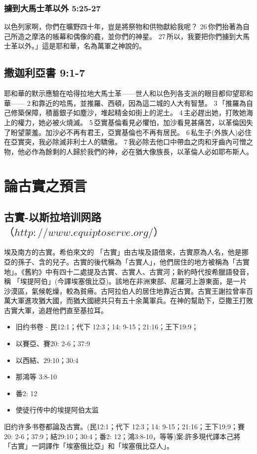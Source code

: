 \subsubsection{擄到大馬士革以外 5:25-27}
以色列家啊，你們在曠野四十年，豈是將祭物和供物獻給我呢？ 26 你們抬著為自己所造之摩洛的帳幕和偶像的龕，並你們的神星。 27 所以，我要把你們擄到大馬士革以外。」這是耶和華，名為萬軍之神說的。




\subsection{撒迦利亞書 9:1-7}
耶和華的默示應驗在哈得拉地大馬士革——世人和以色列各支派的眼目都仰望耶和華—— 2 和靠近的哈馬，並推羅、西頓，因為這二城的人大有智慧。 3 「推羅為自己修築保障，積蓄銀子如塵沙，堆起精金如街上的泥土。 4 主必趕出她，打敗她海上的權力，她必被火燒滅。 5 亞實基倫看見必懼怕，加沙看見甚痛苦，以革倫因失了盼望蒙羞。加沙必不再有君王，亞實基倫也不再有居民。 6 私生子(外族人)必住在亞實突，我必除滅非利士人的驕傲。 7 我必除去他口中帶血之肉和牙齒內可憎之物，他必作為餘剩的人歸於我們的神，必在猶大像族長，以革倫人必如耶布斯人。







\section{論古實之預言}
\subsection{古實-以斯拉培训网路$（http://www.equiptoserve.org/）$}
埃及南方的古實。希伯來文的 「古實」由古埃及語借來，古實原為人名，他是挪亞的孫子、含的兒子。古實的後代稱為「古實人」，他們居住的地方被稱為「古實地」。《舊約》中有四十二處提及古實、古實人、古實河；新約時代按希臘語發音，稱 「埃提阿伯」(今譯埃塞俄比亞)。該地在非洲東部、尼羅河上游東面，是一片沙漠區，氣候乾燥，較為貧瘠。古阿拉伯人的居住地靠近古實。古實王謝拉曾率百萬大軍進攻猶大國，而猶大國總共只有五十余萬軍兵。在神的幫助下，亞撒王打敗古實大軍，追趕他們直至基拉耳。
\begin{itemize}
\item 旧约书卷 - 民12:1；代下 12:3；14: 9-15；21:16；王下19:9；
\item 以賽亞、賽20: 2-6；37:9
\item 以西結、29:10；30:4
\item 那鴻等 3:8-10
\item 番2: 12
\item 使徒行传中的埃提阿伯太监
\end{itemize}
旧约许多书卷都論及古實。(民12:1；代下 12:3；14: 9-15；21:16；王下19:9；賽20: 2-6；37:9；結29:10；30:4；番2: 12；鴻3:8-10，等等)案:許多現代譯本己將「古實」一詞譯作「埃塞俄比亞」和「埃塞俄比亞人」。


